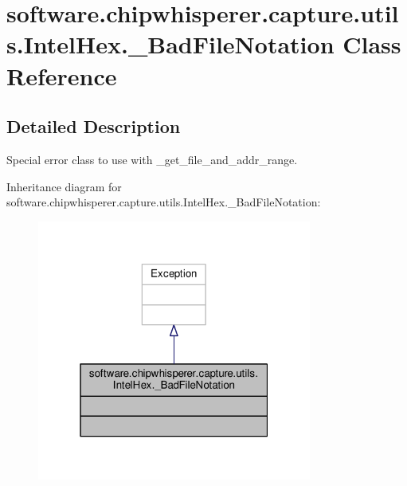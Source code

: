 \hypertarget{classsoftware_1_1chipwhisperer_1_1capture_1_1utils_1_1IntelHex_1_1__BadFileNotation}{}\section{software.\+chipwhisperer.\+capture.\+utils.\+Intel\+Hex.\+\_\+\+Bad\+File\+Notation Class Reference}
\label{classsoftware_1_1chipwhisperer_1_1capture_1_1utils_1_1IntelHex_1_1__BadFileNotation}


\subsection{Detailed Description}
\begin{DoxyVerb}Special error class to use with _get_file_and_addr_range.\end{DoxyVerb}
 

Inheritance diagram for software.\+chipwhisperer.\+capture.\+utils.\+Intel\+Hex.\+\_\+\+Bad\+File\+Notation\+:\nopagebreak
\begin{figure}[H]
\begin{center}
\leavevmode
\includegraphics[width=256pt]{de/de5/classsoftware_1_1chipwhisperer_1_1capture_1_1utils_1_1IntelHex_1_1__BadFileNotation__inherit__graph}
\end{center}
\end{figure}


